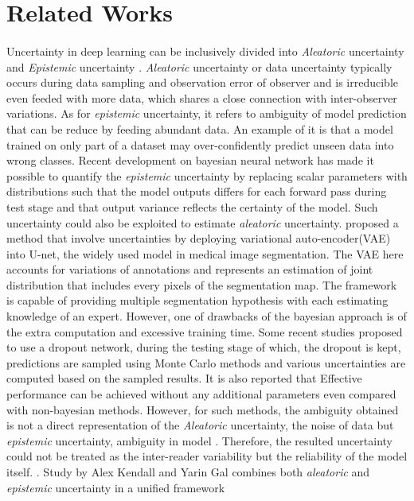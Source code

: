 \documentclass[12pt]{extarticle}
\begin{document}
\section{Related Works}
\paragraph{}
Uncertainty in deep learning can be inclusively divided into \textit{Aleatoric}
uncertainty and \textit{Epistemic} uncertainty \cite{kendall2017uncertainties}.
\textit{Aleatoric} uncertainty or data uncertainty typically occurs during data sampling and
observation error of observer and is irreducible even feeded with more data, which shares a
close connection with inter-observer variations. As for \textit{epistemic}
uncertainty, it refers to ambiguity of model prediction that can be reduce by feeding abundant data.
An example of it is that a model trained on only part of a dataset may over-confidently
predict unseen data into wrong classes. Recent development on bayesian neural network has made it possible
to quantify the \textit{epistemic} uncertainty by replacing scalar parameters with distributions such that 
the model outputs differs for each forward pass during test stage and that output variance reflects the 
certainty of the model. Such uncertainty could also be exploited to estimate \textit{aleatoric} uncertainty.
\cite{kohl2019probabilistic} proposed a method that involve uncertainties by
deploying variational auto-encoder(VAE) into U-net, the widely used model in medical image segmentation. 
The VAE here accounts for variations of annotations and represents an estimation of joint distribution that 
includes every pixels of the segmentation map. The framework is capable of providing multiple segmentation 
hypothesis with each estimating knowledge of an expert.
However, one of drawbacks of the bayesian approach is of the extra computation
and excessive training time. Some recent studies proposed to use a dropout network,
during the testing stage of which, the dropout is kept, predictions are sampled
using Monte Carlo methods and various uncertainties are computed based on the sampled results.
It is also reported that Effective performance can be achieved without any additional parameters even 
compared with non-bayesian methods. However, for such methods, the ambiguity obtained is
not a direct representation of the \textit{Aleatoric} uncertainty,
the noise of data but \textit{epistemic} uncertainty, ambiguity in model
\cite{kendall2017uncertainties}. Therefore, the resulted uncertainty could not
be treated as the inter-reader variability but the reliability of the model itself.
\cite{nair2018exploring}. Study by Alex Kendall and Yarin Gal \cite{kendall2017uncertainties} 
combines both \textit{aleatoric} and \textit{epistemic} uncertainty in a unified framework 
\end{document}

